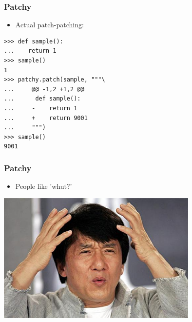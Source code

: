 \documentclass{beamer}
\begin{document}
\begin{frame}[fragile]\frametitle{Patchy}

    \begin{itemize}
        \item Actual patch-patching:
    \end{itemize}

    \begin{lstlisting}
>>> def sample():
...    return 1
>>> sample()
1
>>> patchy.patch(sample, """\
...     @@ -1,2 +1,2 @@
...      def sample():
...     -    return 1
...     +    return 9001
...     """)
>>> sample()
9001
    \end{lstlisting}

\end{frame}


\begin{frame}[fragile]\frametitle{Patchy}

    \begin{itemize}
        \item People like 'whut?'
    \end{itemize}

    \begin{center}
        \includegraphics[width=10cm]{jackie-chan-whut}
    \end{center}

\end{frame}
\end{document}
